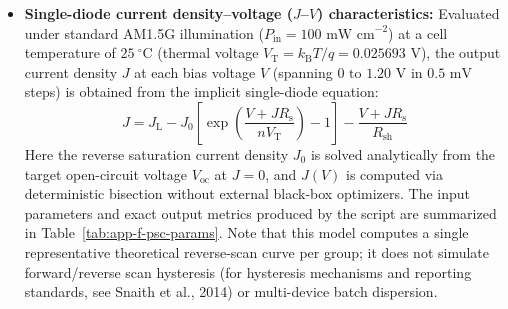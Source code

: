 \begin{itemize}
  \item \textbf{Single-diode current density--voltage ($J$--$V$) characteristics:} Evaluated under standard AM1.5G illumination ($P_{\mathrm{in}} = 100\text{ mW cm}^{-2}$) at a cell temperature of $25\ ^\circ\text{C}$ (thermal voltage $V_{\mathrm{T}} = k_{\mathrm{B}}T/q = 0.025693\text{ V}$), the output current density $J$ at each bias voltage $V$ (spanning $0\text{ to }1.20\text{ V}$ in $0.5\text{ mV}$ steps) is obtained from the implicit single-diode equation:
  \[
    J = J_{\mathrm{L}} - J_0 \left[\exp\!\left(\frac{V + J R_{\mathrm{s}}}{n V_{\mathrm{T}}}\right) - 1\right] - \frac{V + J R_{\mathrm{s}}}{R_{\mathrm{sh}}}
  \]
  Here the reverse saturation current density $J_0$ is solved analytically from the target open-circuit voltage $V_{\mathrm{oc}}$ at $J=0$, and $J(V)$ is computed via deterministic bisection without external black-box optimizers. The input parameters and exact output metrics produced by the script are summarized in Table~\ref{tab:app-f-psc-params}. Note that this model computes a single representative theoretical reverse-scan curve per group; it does not simulate forward/reverse scan hysteresis (for hysteresis mechanisms and reporting standards, see Snaith et al., 2014) or multi-device batch dispersion.

\begin{table}[htbp]
\centering
\caption{Single-diode model parameters and exact simulated performance metrics for the perovskite solar cell case study}\label{tab:app-f-psc-params}
\end{table}


\end{itemize}
